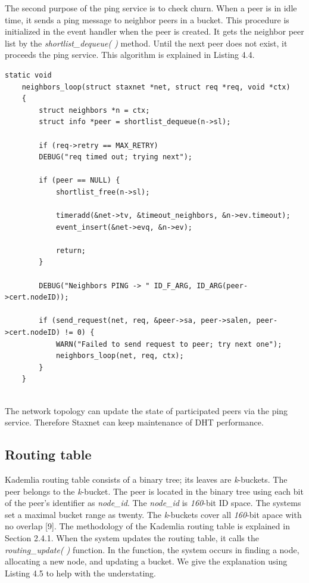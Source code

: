 The second purpose of the ping service is to check churn. When a peer is in idle time, it sends a ping message to neighbor peers in a bucket. This procedure is initialized in the event handler when the peer is created. It gets the neighbor peer list by the \textit{shortlist\_dequeue( )} method. Until the next peer does not exist, it proceeds the ping service. This algorithm is explained in Listing 4.4.

\lstset{language=C} 
\begin{lstlisting}[caption=The neighbors\_loop( ) method]
	static void
	neighbors_loop(struct staxnet *net, struct req *req, void *ctx)
	{
		struct neighbors *n = ctx;
		struct info *peer = shortlist_dequeue(n->sl);
		
		if (req->retry == MAX_RETRY)
		DEBUG("req timed out; trying next");
		
		if (peer == NULL) {
			shortlist_free(n->sl);
			
			timeradd(&net->tv, &timeout_neighbors, &n->ev.timeout);
			event_insert(&net->evq, &n->ev);
			
			return;
		}
		
		DEBUG("Neighbors PING -> " ID_F_ARG, ID_ARG(peer->cert.nodeID));
		
		if (send_request(net, req, &peer->sa, peer->salen, peer->cert.nodeID) != 0) {
			WARN("Failed to send request to peer; try next one");
			neighbors_loop(net, req, ctx);
		}
	}
	
\end{lstlisting}
The network topology can update the state of participated peers via the ping service. Therefore Staxnet can keep maintenance of DHT performance.

\subsection{Routing table}

Kademlia routing table consists of a binary tree; its leaves are \textit{k}-buckets. The peer belongs to the \textit{k}-bucket. The peer is located in the binary tree using each bit of the peer's identifier as \textit{node\_id}. The \textit{node\_id} is \textit{160}-bit ID space. The systems set a maximal bucket range as twenty. The \textit{k}-buckets cover all \textit{160}-bit apace with no overlap \cite{bibid}[9]. The methodology of the Kademlia routing table is explained in Section 2.4.1. 
When the system updates the routing table, it calls the \textit{routing\_update( )} function. In the function, the system occurs in finding a node, allocating a new node, and updating a bucket. We give the explanation using Listing 4.5 to help with the understating.

